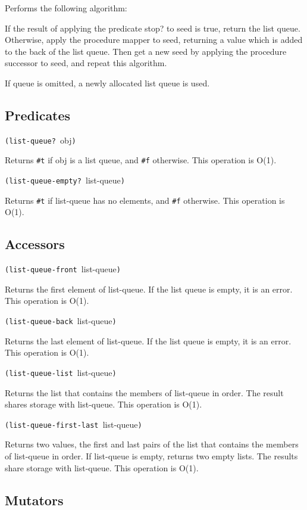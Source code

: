 Performs the following algorithm:

If the result of applying the predicate stop? to seed is true, return
the list queue. Otherwise, apply the procedure mapper to seed, returning
a value which is added to the back of the list queue. Then get a new
seed by applying the procedure successor to seed, and repeat this
algorithm.

If queue is omitted, a newly allocated list queue is used.

\subsection{Predicates}\label{Predicates}

\texttt{(list-queue?\ }obj\texttt{)}

Returns \texttt{\#t} if obj is a list queue, and \texttt{\#f} otherwise.
This operation is O(1).

\texttt{(list-queue-empty?\ }list-queue\texttt{)}

Returns \texttt{\#t} if list-queue has no elements, and \texttt{\#f}
otherwise. This operation is O(1).

\subsection{Accessors}\label{Accessors}

\texttt{(list-queue-front\ }list-queue\texttt{)}

Returns the first element of list-queue. If the list queue is empty, it
is an error. This operation is O(1).

\texttt{(list-queue-back\ }list-queue\texttt{)}

Returns the last element of list-queue. If the list queue is empty, it
is an error. This operation is O(1).

\texttt{(list-queue-list\ }list-queue\texttt{)}

Returns the list that contains the members of list-queue in order. The
result shares storage with list-queue. This operation is O(1).

\texttt{(list-queue-first-last\ }list-queue\texttt{)}

Returns two values, the first and last pairs of the list that contains
the members of list-queue in order. If list-queue is empty, returns two
empty lists. The results share storage with list-queue. This operation
is O(1).

\subsection{Mutators}\label{Mutators}

